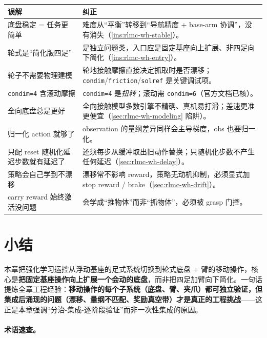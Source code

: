 \begin{center}
\small
\begin{tabular}{@{}p{5.2cm}p{8.0cm}@{}}
\toprule
误解 & 纠正 \\
\midrule
底盘稳定 = 任务更简单 & 难度从“平衡”转移到“导航精度 + base-arm 协调”，没有消失（\cref{ins:rlmc-wh-stable}）。 \\
轮式是“简化版四足” & 是独立问题类，入口应是固定基座向上扩展、非四足向下简化（\cref{ins:rlmc-wh-entry}）。 \\
轮子不需要物理建模 & 轮地接触摩擦直接决定抓取时是否漂移；\verb|condim|/\verb|friction|/\verb|solref| 是关键调试项。 \\
\verb|condim=4| 含滚动摩擦 & \verb|condim=4| 是\emph{扭转}；滚动需 \verb|condim=6|（官方文档已核）。 \\
全向底盘总是更好 & 全向接触模型多数引擎不精确、真机易打滑；差速更准更便宜（\cref{sec:rlmc-wh-modeling} 陷阱）。 \\
归一化 action 就够了 & observation 的量纲差异同样会主导梯度，obs 也要归一化。 \\
只配 reset 随机化延迟步数就有延迟了 & 还须每步从缓冲取出旧动作替换；只随机化步数不产生任何延迟（\cref{sec:rlmc-wh-delay}）。 \\
策略会自己学到不漂移 & 漂移常不影响 reward，策略无动机抑制，必须显式加 stop reward / brake（\cref{sec:rlmc-wh-drift}）。 \\
carry reward 始终激活没问题 & 会学成“推物体”而非“抓物体”，必须被 grasp 门控。 \\
\bottomrule
\end{tabular}
\end{center}

\section{小结}
\label{sec:rlmc-wh-summary}

本章把强化学习运控从浮动基座的足式系统切换到轮式底盘 + 臂的移动操作，核心是\textbf{把固定基座操作向上扩展一个会动的底盘}，而非把四足加臂向下简化。一句话提炼全章工程经验：\textbf{移动操作的每个子系统（底盘、臂、夹爪）都可独立验证，但集成后涌现的问题（漂移、量纲不匹配、奖励真空带）才是真正的工程挑战}——这正是本章强调“分治-集成-逐阶段验证”而非一次性集成的原因。

\paragraph{术语速查。}


